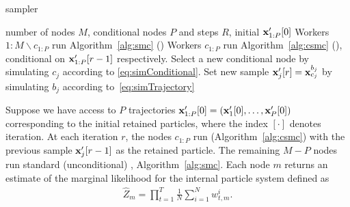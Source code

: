 \begin{algorithm}[tb]
	\caption{\ipmcmc sampler}
	\label{alg:ipmc}
	\begin{spacing}{1.2}
	\begin{algorithmic}[1]
		\renewcommand{\algorithmicrequire}{\textbf{Inputs:}}
		\renewcommand{\algorithmicensure}{\textbf{Outputs:}}				 
		\Require number of nodes $M$, conditional nodes $P$ and \mcmc steps $R$, initial $\mathbf{x}_{1:P}'[0]$
		\State Workers $1:M \backslash c_{1:P}$ run Algorithm~\ref{alg:smc} (\smc)
		\State Workers $c_{1:P}$ run Algorithm~\ref{alg:csmc} (\csmc), conditional on $\mathbf{x}_{1:P}'[r-1]$ respectively.
		\State Select a new conditional node by simulating $c_j$ according to \eqref{eq:simConditional}. %
		\State Set new \mcmc sample $\mathbf{x}_j'[r] = \mathbf{x}_{c_j}^{b_j}$ by simulating $b_j$ according to~\eqref{eq:simTrajectory}
		\EndFor
		\EndFor
	\end{algorithmic}
\end{spacing}
\end{algorithm}

Suppose we have access to $P$ trajectories ${\mathbf{x}_{1:P}'[0]=(\mathbf{x}_1'[0],\ldots,\mathbf{x}_P'[0])}$ corresponding to the initial retained particles, where the index $[\cdot]$ denotes \mcmc iteration. At each iteration $r$, the nodes $c_{1:P}$ run \csmc (Algorithm~\ref{alg:csmc}) with the previous \mcmc sample $\mathbf{x}_j'[r-1]$ as the retained particle. The remaining $M-P$ nodes run standard (unconditional) \smc, \ie Algorithm~\ref{alg:smc}.  Each node $m$ returns an estimate of the marginal likelihood for the internal particle system defined as
\begin{align}
\label{eq:ML}
\hat Z_{m} = \prod_{t=1}^T \frac{1}{N} \sum_{i=1}^N w_{t,m}^{i}.
\end{align}

